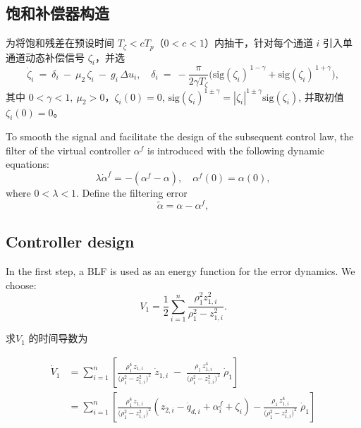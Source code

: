 \documentclass[pdflatex,sn-mathphys-num]{sn-jnl}%
\theoremstyle{thmstyleone}%
\theoremstyle{thmstyletwo}%
\theoremstyle{thmstylethree}%
\begin{document}
\subsection{饱和补偿器构造}


为将饱和残差在预设时间 $T_\zeta<cT_p$（$0<c<1$）内抽干，针对每个通道 $i$ 引入单通道动态补偿信号 $\zeta_{i}$，并选
\begin{equation}\label{eq:zeta2-pts}
\dot\zeta_i \ =\ \delta_i\ -\ \mu_2\,\zeta_i\ -\ g_i\,\Delta u_i,\quad
\delta_i\ =\ -\frac{\pi}{2\gamma T_\zeta}\Big(\mathrm{sig}(\zeta_i)^{\,1-\gamma}+\mathrm{sig}(\zeta_i)^{\,1+\gamma}\Big),
\end{equation}
其中 $0<\gamma<1,\ \mu_2>0$，$\zeta_i(0)=0$, $\mathrm{sig}(\zeta_i)^{1\pm \gamma}=|\zeta_i|^{1\pm \gamma}\mathrm{sig}(\zeta_i)$, 并取初值 $\zeta_{i}(0)=0$。



 To smooth the signal and facilitate the design of the subsequent control law, the filter of the virtual controller $\alpha^{f}$ is introduced with the following dynamic equations:
\begin{equation}\label{eq:22}
	\lambda \dot{\alpha}^{f}
	= -\left(\alpha^{f}-\alpha\right),
	\quad
	\alpha^{f}(0)=\alpha(0),
\end{equation}
where $0<\lambda<1$. Define the filtering error 
\begin{equation}\label{eq:23}
	\tilde{\alpha}= \alpha-\alpha^{f},
\end{equation}


\subsection{Controller design}



In the first step, a BLF is used as an energy function for the error dynamics. We choose:
\begin{equation}\label{eq:25}
	V_1= \frac{1}{2}\sum_{i=1}^{n} \frac{\rho_{1}^2 z_{1,i}^2}{\rho_{1}^2-z_{1,i}^2}. 
\end{equation}

求$V_1$ 的时间导数为

\begin{equation}\label{eq:25}
	\begin{aligned}
\dot V_1
&=\sum_{i=1}^{n}\left[
\frac{\rho_{1}^4\,z_{1,i}}{\big(\rho_{1}^{2}-z_{1,i}^{2}\big)^{2}}\;\dot z_{1,i}
\;-\;
\frac{\rho_{1}\,z_{1,i}^{4}}{\big(\rho_{1}^{2}-z_{1,i}^{2}\big)^{2}}\;\dot \rho_{1}
\right]\\
&=\sum_{i=1}^{n}\left[
\frac{\rho_{1}^4\,z_{1,i}}{\big(\rho_{1}^{2}-z_{1,i}^{2}\big)^{2}}(z_{2,i}-\dot q_{d,i}+\alpha^{f}_i+\zeta_i)-
\frac{\rho_{1}\,z_{1,i}^{4}}{\big(\rho_{1}^{2}-z_{1,i}^{2}\big)^{2}}\;\dot \rho_{1}
\right]
\end{aligned}
\end{equation}
\end{document}
